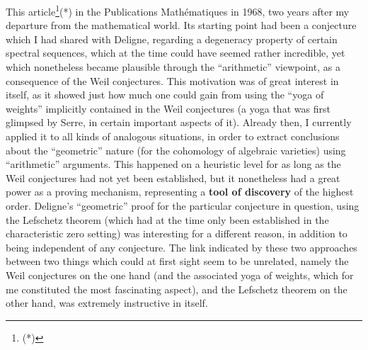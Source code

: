 This article\footnote{(*)}(*) in the Publications Math\'ematiques in 1968, 
two years after my departure from the mathematical world. Its starting point had been a
conjecture which I had shared with Deligne, regarding a degeneracy property of certain
spectral sequences, which at the time could have seemed rather incredible, yet  which
nonetheless became plausible through the ``arithmetic'' viewpoint, as a consequence of the
Weil conjectures. This motivation was of great interest in itself, as it showed just how
much one could gain from using the ``yoga of weights'' implicitly contained in the Weil
conjectures (a yoga that was first glimpsed by Serre, in certain important aspects of it).
Already then, I currently applied it to all kinds of analogous situations, 
in order to extract conclusions about the ``geometric'' nature 
(for the cohomology of algebraic varieties) using ``arithmetic'' arguments. 
This happened on a heuristic level for as long as the Weil conjectures had not yet been
established, but it nonetheless had a 
great power as a proving mechanism, representing a \textbf{tool of discovery} of the
highest order. 
Deligne's ``geometric'' proof for the particular conjecture in question, using the
Lefschetz theorem (which had at the time only been established in the characteristic zero
setting) was interesting for a different reason, 
in addition to being independent of any conjecture.
The link indicated by these two approaches between two things which could at first sight
seem to be unrelated, namely the Weil conjectures on the one hand (and the associated yoga
of weights, which for me constituted the most fascinating aspect), and the Lefschetz
theorem on the other hand, was extremely instructive in itself. 

